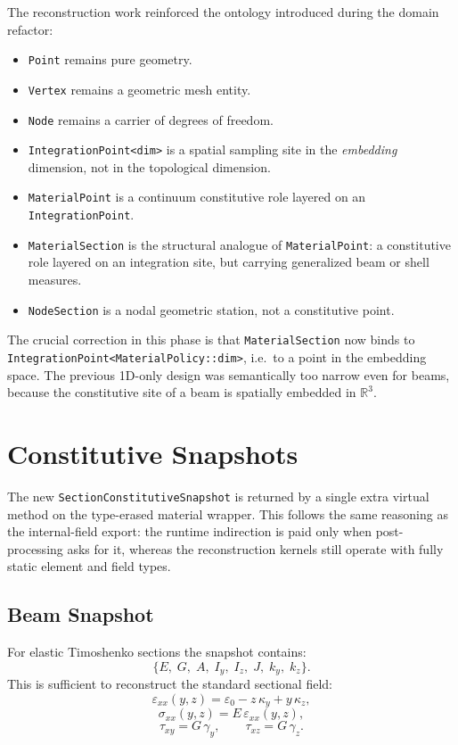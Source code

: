 The reconstruction work reinforced the ontology introduced during the domain
refactor:
\begin{itemize}
  \item \texttt{Point} remains pure geometry.
  \item \texttt{Vertex} remains a geometric mesh entity.
  \item \texttt{Node} remains a carrier of degrees of freedom.
  \item \texttt{IntegrationPoint<dim>} is a spatial sampling site in the
        \emph{embedding} dimension, not in the topological dimension.
  \item \texttt{MaterialPoint} is a continuum constitutive role layered on an
        \texttt{IntegrationPoint}.
  \item \texttt{MaterialSection} is the structural analogue of
        \texttt{MaterialPoint}: a constitutive role layered on an integration
        site, but carrying generalized beam or shell measures.
  \item \texttt{NodeSection} is a nodal geometric station, not a constitutive
        point.
\end{itemize}

The crucial correction in this phase is that \texttt{MaterialSection} now binds
to \texttt{IntegrationPoint<MaterialPolicy::dim>}, i.e.\ to a point in the
embedding space.  The previous 1D-only design was semantically too narrow even
for beams, because the constitutive site of a beam is spatially embedded in
$\mathbb{R}^3$.

\section{Constitutive Snapshots}

The new \texttt{SectionConstitutiveSnapshot} is returned by a single extra
virtual method on the type-erased material wrapper.  This follows the same
reasoning as the internal-field export: the runtime indirection is paid only
when post-processing asks for it, whereas the reconstruction kernels still
operate with fully static element and field types.

\subsection{Beam Snapshot}

For elastic Timoshenko sections the snapshot contains:
\[
\{E,\; G,\; A,\; I_y,\; I_z,\; J,\; k_y,\; k_z\}.
\]
This is sufficient to reconstruct the standard sectional field:
\[
\varepsilon_{xx}(y,z) = \varepsilon_0 - z\,\kappa_y + y\,\kappa_z,
\]
\[
\sigma_{xx}(y,z) = E\,\varepsilon_{xx}(y,z),
\]
\[
\tau_{xy} = G\,\gamma_y, \qquad \tau_{xz} = G\,\gamma_z.
\]

